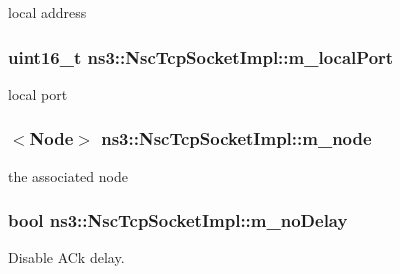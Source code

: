 local address 

\subsubsection[{\texorpdfstring{m\+\_\+local\+Port}{m_localPort}}]{\setlength{\rightskip}{0pt plus 5cm}uint16\+\_\+t ns3\+::\+Nsc\+Tcp\+Socket\+Impl\+::m\+\_\+local\+Port\hspace{0.3cm}{\ttfamily [private]}}\hypertarget{classns3_1_1NscTcpSocketImpl_aa591275dc269c0d7b803d83ccd3279aa}{}\label{classns3_1_1NscTcpSocketImpl_aa591275dc269c0d7b803d83ccd3279aa}


local port 

\subsubsection[{\texorpdfstring{m\+\_\+node}{m_node}}]{$<${\bf Node}$>$ ns3\+::\+Nsc\+Tcp\+Socket\+Impl\+::m\+\_\+node\hspace{0.3cm}{\ttfamily [private]}}\hypertarget{classns3_1_1NscTcpSocketImpl_a41ef80cb2b67f55bc3f89918e68a5111}{}\label{classns3_1_1NscTcpSocketImpl_a41ef80cb2b67f55bc3f89918e68a5111}


the associated node 

\subsubsection[{\texorpdfstring{m\+\_\+no\+Delay}{m_noDelay}}]{\setlength{\rightskip}{0pt plus 5cm}bool ns3\+::\+Nsc\+Tcp\+Socket\+Impl\+::m\+\_\+no\+Delay\hspace{0.3cm}{\ttfamily [private]}}\hypertarget{classns3_1_1NscTcpSocketImpl_a176dd4a9e23dda76386f8b71104a0f51}{}\label{classns3_1_1NscTcpSocketImpl_a176dd4a9e23dda76386f8b71104a0f51}


Disable A\+Ck delay. 

